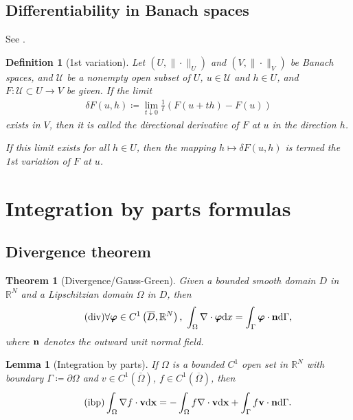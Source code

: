 \documentclass[oneside]{book}
\numberwithin{equation}{section}
\newtheorem{lemma}{Lemma}[section]
\newtheorem{definition}{Definition}[section]
\newtheorem{theorem}{Theorem}[section]
\begin{document}
\subsection{Differentiability in Banach spaces}
See \cite[Chap. 2, Sect. 2.6]{Troltzsch2010}.

\begin{definition}[1st variation]
    Let $(U,\|\cdot\|_U)$ and $(V,\|\cdot\|_V)$ be Banach spaces, and $\mathcal{U}$ be a nonempty open subset of $U$, $u\in\mathcal{U}$ and $h\in U$, and $F:\mathcal{U}\subset U\to V$ be given. If the limit
    \begin{align*}
        \delta F(u,h)\coloneqq\lim_{t\downarrow 0} \frac{1}{t}\left(F(u + th) - F(u)\right)
    \end{align*}
    exists in $V$, then it is called the \emph{directional derivative} of $F$ at $u$ in the direction $h$.
    
    If this limit exists for all $h\in U$, then the mapping $h\mapsto\delta F(u,h)$ is termed the \emph{1st variation} of $F$ at $u$.
\end{definition}

\section{Integration by parts formulas}

\subsection{Divergence theorem}

\begin{theorem}[Divergence/Gauss-Green]
    \label{theorem: divergence}
    Given a bounded smooth domain $D$ in $\mathbb{R}^N$ and a Lipschitzian domain $\Omega$ in $D$, then
    \begin{align}
        \label{div}
        \tag{div}
        \forall\boldsymbol{\varphi}\in C^1\left(\overline{D},\mathbb{R}^N\right),\ \int_\Omega \nabla\cdot\boldsymbol{\varphi}{\rm d}x = \int_\Gamma \boldsymbol{\varphi}\cdot{\bf n}{\rm d}\Gamma,
    \end{align}
    where ${\bf n}$ denotes the outward unit normal field.
\end{theorem}

\begin{lemma}[Integration by parts]
    If $\Omega$ is a bounded $C^1$ open set in $\mathbb{R}^N$ with boundary $\Gamma\coloneqq\partial\Omega$ and $v\in C^1(\overline{\Omega})$, $f\in C^1(\overline{\Omega})$, then
    \begin{align}
        \label{ibp}
        \tag{ibp}
        \int_\Omega \nabla f\cdot{\bf v}{\rm d}{\bf x} = -\int_\Omega f\nabla\cdot{\bf v}{\rm d}{\bf x} + \int_\Gamma f{\bf v}\cdot{\bf n}{\rm d}\Gamma.
    \end{align}
\end{lemma}
\end{document}
